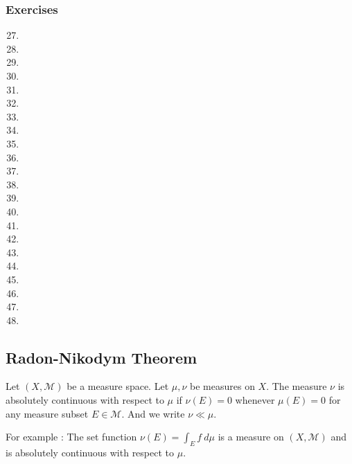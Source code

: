 \subsubsection{Exercises}
\begin{enumerate}
	\setcounter{enumi}{26}
	\item
	\item
	\item
	\item
	\item
	\item
	\item
	\item
	\item
	\item
	\item
	\item
	\item
	\item
	\item
	\item
	\item
	\item
	\item
	\item
	\item
	\item
\end{enumerate}

\subsection{Radon-Nikodym Theorem}
\begin{definition}
	Let $(X,\mathcal{M})$ be a measure space.
	Let $\mu,\nu$ be measures on $X$.
	The measure $\nu$ is absolutely continuous with respect to $\mu$ if $\nu(E) = 0$ whenever $\mu(E) = 0$ for any measure subset $E \in \mathcal{M}$.
	And we write $\nu \ll \mu$.
\end{definition}
	For example : The set function $\nu(E) = \displaystyle \int_E f \ d\mu$ is a measure on $(X,\mathcal{M})$ and is absolutely continuous with respect to $\mu$.

